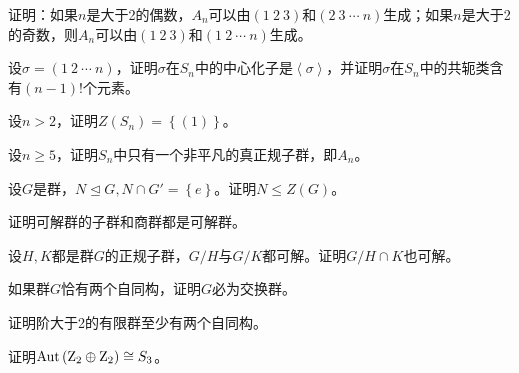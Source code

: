 \begin{prob}
证明：如果$n$是大于2的偶数，$A_{n}$可以由$\left(1\ 2\ 3\right)$和$\left(2\ 3\ \cdots \ n\right)$生成；如果$n$是大于2的奇数，则$A_{n}$可以由$\left(1\ 2\ 3\right)$和$\left(1\ 2\ \cdots \ n\right)$生成。
\end{prob}
\begin{prob}
设$\sigma =\left(1\ 2\ \cdots \ n\right)$，证明$\sigma $在$S_{n}$中的中心化子是$\left\langle \sigma  \right\rangle $，并证明$\sigma $在$S_{n}$中的共轭类含有$\left(n-1\right)!$个元素。
\end{prob}
\begin{prob}
设$n>2$，证明$Z\left(S_{n}\right)=\left\{(1) \right\}$。
\end{prob}
\begin{prob}
设$n\geqslant 5$，证明$S_{n}$中只有一个非平凡的真正规子群，即$A_{n}$。
\end{prob}
\begin{prob}
设$G$是群，$N\trianglelefteq G,N\cap G'=\left\{e \right\}$。证明$N\leqslant Z\left(G\right)$。
\end{prob}
\begin{prob}
证明可解群的子群和商群都是可解群。
\end{prob}
\begin{prob}
设$H,K$都是群$G$的正规子群，$G/H$与$G/K$都可解。证明$G/H\cap K$也可解。
\end{prob}
\begin{prob}
如果群$G$恰有两个自同构，证明$G$必为交换群。
\end{prob}
\begin{prob}
证明阶大于2的有限群至少有两个自同构。
\end{prob}
\begin{prob}
证明${\rm Aut}\left({\rm Z}_{2}\oplus {\rm Z}_{2}\right)\cong S_{3}$。
\end{prob}
